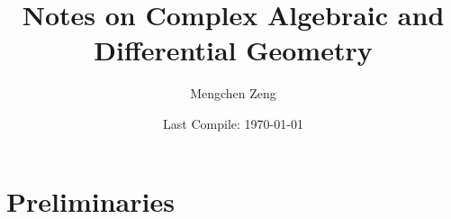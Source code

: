 \documentclass{book}
\title{Notes on Complex Algebraic and Differential Geometry}
\author{Mengchen Zeng}
\date{Last Compile: \today}
\theoremstyle{definition}
\theoremstyle{plain}
\theoremstyle{remark}
\begin{document}
\maketitle

\frontmatter

\mainmatter

\setcounter{part}{-1}
\part{Preliminaries}

\end{document}
